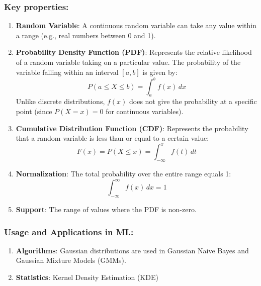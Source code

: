 \subsubsection*{Key properties:}
\begin{enumerate}
    \item \textbf{Random Variable}: A continuous random variable can take any value within a range (e.g., real numbers between 0 and 1).
    \item \textbf{Probability Density Function (PDF)}: Represents the relative likelihood of a random variable taking on a particular value. The probability of the variable falling within an interval $[a, b]$ is given by:
    \[
        P(a \leq X \leq b) = \int_a^b f(x) \, dx
    \]
    Unlike discrete distributions, $f(x)$ does not give the probability at a specific point (since $P(X = x) = 0$ for continuous variables).
    \item \textbf{Cumulative Distribution Function (CDF)}: Represents the probability that a random variable is less than or equal to a certain value:
    \[
        F(x) = P(X \leq x) = \int_{-\infty}^x f(t) \, dt
    \]
    \item \textbf{Normalization}: The total probability over the entire range equals 1:
    \[
        \int_{-\infty}^\infty f(x) \, dx = 1
    \]
    \item \textbf{Support}: The range of values where the PDF is non-zero.
\end{enumerate}

\subsubsection*{Usage and Applications in ML:}
\begin{enumerate}
    \item \textbf{Algorithms}: Gaussian distributions are used in Gaussian Naive Bayes and Gaussian Mixture Models (GMMs).
    \item \textbf{Statistics}: Kernel Density Estimation (KDE)
\end{enumerate}
